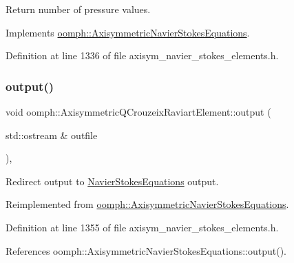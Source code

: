 Return number of pressure values. 



Implements \hyperlink{classoomph_1_1AxisymmetricNavierStokesEquations_a89edaffb4913131cc14a5f6e45ed117a}{oomph\+::\+Axisymmetric\+Navier\+Stokes\+Equations}.



Definition at line 1336 of file axisym\+\_\+navier\+\_\+stokes\+\_\+elements.\+h.

\mbox{\label{classoomph_1_1AxisymmetricQCrouzeixRaviartElement_af7811d55e87a839fb5c01d9e306cfda8}} 
\subsubsection{\texorpdfstring{output()}{output()}\hspace{0.1cm}{\footnotesize\ttfamily [1/4]}}
{\footnotesize\ttfamily void oomph\+::\+Axisymmetric\+Q\+Crouzeix\+Raviart\+Element\+::output (\begin{DoxyParamCaption}\item[{std\+::ostream \&}]{outfile }\end{DoxyParamCaption})\hspace{0.3cm}{\ttfamily [inline]}, {\ttfamily [virtual]}}



Redirect output to \hyperlink{classoomph_1_1NavierStokesEquations}{Navier\+Stokes\+Equations} output. 



Reimplemented from \hyperlink{classoomph_1_1AxisymmetricNavierStokesEquations_afe0c7b607ec3fd03a73b7db4f1fe6252}{oomph\+::\+Axisymmetric\+Navier\+Stokes\+Equations}.



Definition at line 1355 of file axisym\+\_\+navier\+\_\+stokes\+\_\+elements.\+h.



References oomph\+::\+Axisymmetric\+Navier\+Stokes\+Equations\+::output().

\mbox{\label{classoomph_1_1AxisymmetricQCrouzeixRaviartElement_afb5ef7f9b09d4b3ed6d5ee04cad58fec}} 
